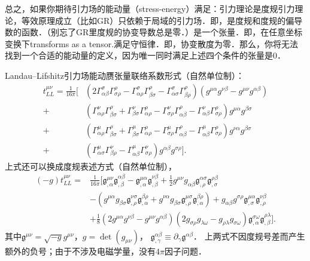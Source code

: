 总之，如果你期待引力场的能动量（stress-energy）满足：引力理论是度规引力理论，等效原理成立（比如GR）只依赖于局域的引力场．即，是度规和度规的偏导数的函数．（别忘了GR里度规的协变导数总是零．）是一个张量．即，在任意坐标变换下transforms as a tensor.满足守恒律．即，协变散度为零．那么，你将无法找到一个合适的能动量的定义，因为唯一同时满足上述四个条件的张量是0．



Landau--Lifshitz引力场能动赝张量联络系数形式（自然单位制）：
\begin{equation}\label{chlh:eqn_t-stress-Gamma}
	\begin{aligned}
		t_{LL}^{\mu \nu}  = \frac{1}{16\pi}\Big[
		&(2\Gamma^{\sigma}_{\alpha \beta}\Gamma^{\rho}_{\sigma \rho}
		- \Gamma^{\sigma}_{\alpha \rho}\Gamma^{\rho}_{\beta \sigma}
		- \Gamma^{\sigma}_{\alpha \sigma}\Gamma^{\rho}_{\beta \rho})
		(g^{\mu \alpha}g^{\nu \beta} - g^{\mu \nu}g^{\alpha \beta})  \\
		+&(\Gamma^{\nu}_{\alpha \rho}\Gamma^{\rho}_{\beta \sigma}
		+ \Gamma^{\nu}_{\beta \sigma} \Gamma^{\rho}_{\alpha \rho}
		- \Gamma^{\nu}_{\sigma \rho} \Gamma^{\rho}_{\alpha \beta}
		- \Gamma^{\nu}_{\alpha \beta} \Gamma^{\rho}_{\sigma \rho})g^{\mu \alpha}g^{\beta \sigma}  \\
		+&(\Gamma^{\mu}_{\alpha \rho}\Gamma^{\rho}_{\beta \sigma}
		+\Gamma^{\mu}_{\beta \sigma} \Gamma^{\rho}_{\alpha \rho}
		- \Gamma^{\mu}_{\sigma \rho} \Gamma^{\rho}_{\alpha \beta}
		- \Gamma^{\mu}_{\alpha \beta} \Gamma^{\rho}_{\sigma \rho})g^{\nu \alpha}g^{\beta \sigma}  \\
		+&(\Gamma^{\mu}_{\alpha \sigma} \Gamma^{\nu}_{\beta \rho}
		- \Gamma^{\mu}_{\alpha \beta} \Gamma^{\nu}_{\sigma \rho})g^{\alpha \beta}g^{\sigma \rho}\Big].
	\end{aligned}
\end{equation}
上式还可以换成度规表述方式（自然单位制），
\begin{equation}\label{chlh:eqn_t-stress-metric}
	\begin{aligned}
		(-g)t_{LL}^{\mu \nu} =& \frac{1}{16\pi} \Big[\mathfrak{g}^{\mu \nu}_{,\alpha}
		\mathfrak{g}^{\alpha \beta}_{,\beta} - \mathfrak{g}^{\mu \alpha}_{,\alpha}\mathfrak{g}^{\nu \beta}_{,\beta} +
		\frac{1}{2}g^{\mu \nu}g_{\alpha \beta}\mathfrak{g}^{\alpha \sigma}_{,\rho} \mathfrak{g}^{\rho \beta}_{,\sigma} \\
		&-(g^{\mu \alpha}g_{\beta \sigma}\mathfrak{g}^{\nu \sigma}_{,\rho}
		\mathfrak{g}^{\beta \rho}_{,\alpha}+g^{\nu \alpha}g_{\beta \sigma}
		\mathfrak{g}^{\mu \sigma}_{,\rho}\mathfrak{g}^{\beta \rho}_{,\alpha}) + g_{\alpha \beta}g^{\sigma \rho}
		\mathfrak{g}^{\mu \alpha}_{,\sigma}\mathfrak{g}^{\nu \beta}_{,\rho} \\
		&+\frac{1}{8}(2g^{\mu \alpha}g^{\nu \beta}-g^{\mu \nu}g^{\alpha \beta})
		(2g_{\sigma \rho}g_{\lambda \omega}-g_{\rho \lambda}g_{\sigma \omega})
		\mathfrak{g}^{\sigma \omega}_{,\alpha}\mathfrak{g}^{\rho \lambda}_{,\beta}   \Big] .
	\end{aligned}
\end{equation}
其中$\mathfrak{g}^{\mu\nu}=\sqrt{-g}g^{\mu\nu}$，$g=\det(g_{\mu\nu})$，
$\mathfrak{g}^{\alpha \beta}_{,\gamma}\equiv \partial_\gamma \mathfrak{g}^{\alpha \beta}$．
上两式不因度规号差而产生额外的负号；由于不涉及电磁学量，没有$4\pi$因子问题．


\printbibliography[heading=subbibliography,title=第\ref{chlh}章参考文献]

\endinput



